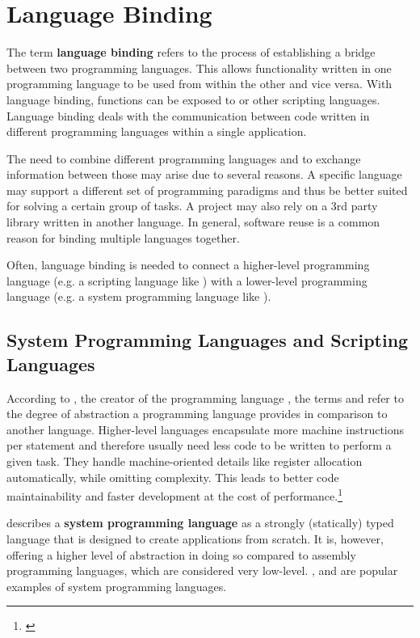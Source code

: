 \chapter{Language Binding}
\label{chap:LanguageBinding}

The term \textbf{language binding} refers to the process of establishing a bridge between two programming languages. This allows functionality written in one programming language to be used from within the other and vice versa. With language binding,  functions can be exposed to  or other scripting languages. Language binding deals with the communication between code written in different programming languages within a single application.

The need to combine different programming languages and to exchange information between those may arise due to several reasons. A specific language may support a different set of programming paradigms and thus be better suited for solving a certain group of tasks. A project may also rely on a 3rd party library written in another language. In general, software reuse is a common reason for binding multiple languages together.

Often, language binding is needed to connect a higher-level programming \linebreak language (e.g. a scripting language like ) with a lower-level programming language (e.g. a system programming language like ).

\section{System Programming Languages and Scripting Languages}

According to , the creator of the programming language , the terms \textbf{} and \textbf{} refer to the degree of abstraction a programming language provides in comparison to another language. Higher-level languages encapsulate more machine instructions per statement and therefore usually need less code to be written to perform a given task. They handle machine-oriented details like register allocation automatically, while omitting complexity. This leads to better code maintainability and faster development at the cost of performance.\footnote{\citep{Ousterhout}}

 describes a \textbf{system programming language} as a strongly (statically) typed language that is designed to create applications from scratch. It is, however, offering a higher level of abstraction in doing so compared to assembly programming languages, which are considered very low-level. ,  and  are popular examples of system programming languages.


